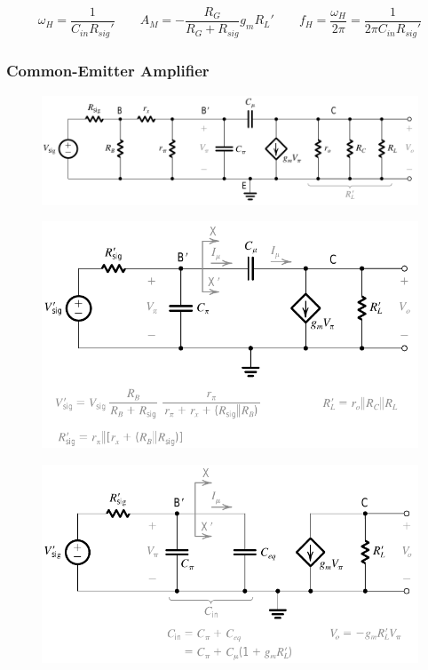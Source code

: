 \begin{equation*}
  \begin{aligned}
    \omega_H = \dfrac{1}{C_{in} R_{sig}'} \quad\quad A_M = - \dfrac{R_G}{R_G + R_{sig}} g_m R_L' \quad\quad f_H = \dfrac{\omega_H}{2 \pi} = \dfrac{1}{2 \pi C_{in} R_{sig}'}   
  \end{aligned}
\end{equation*}

\subsubsection{Common-Emitter Amplifier}

\begin{figure}[H]
  \centering
  \includegraphics[width=0.9\linewidth]{figures/Frequency-Response-CE-High-1}
\end{figure}

\begin{figure}[H]
  \centering
  \includegraphics[width=0.8\linewidth]{figures/Frequency-Response-CE-High-2}
\end{figure}

\begin{figure}[H]
  \centering
  \includegraphics[width=0.8\linewidth]{figures/Frequency-Response-CE-High-3}
\end{figure}

